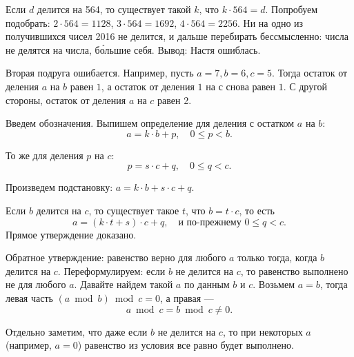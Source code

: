 ﻿
\begin{itemize}
\itA Если $d$ делится на 564, то существует такой $k$, что $k \cdot 564 = d$. Попробуем подобрать:
$2 \cdot 564 = 1128$, $3 \cdot 564 = 1692$, $4 \cdot 564 = 2256$. Ни на одно из получившихся чисел
2016 не делится, и дальше перебирать бессмысленно: числа не делятся на числа, б\'ольшие себя.
Вывод: Настя ошиблась.

\itB Вторая подруга ошибается. Например, пусть $a = 7, b = 6, c = 5$. Тогда остаток от деления
$a$ на $b$ равен $1$, а остаток от деления $1$ на $с$ снова равен $1$. С другой стороны, остаток
от деления $a$ на $c$ равен 2.

\itC Введем обозначения.
Выпишем определение для деления с остатком $a$ на $b$:
	$$a = k \cdot b + p,\quad 0 \le p < b.$$

То же для деления $p$ на $c$:
	$$p = s \cdot c + q,\quad 0 \le q < c.$$ 

Произведем подстановку: $a = k \cdot b + s \cdot c + q$. 

Если $b$ делится на $c$, то существует
такое $t$, что $b = t\cdot c$, то есть
	$$a = (k \cdot t + s) \cdot c + q,\quad \text{и по-прежнему }0 \le q < c.$$
Прямое утверждение доказано.

Обратное утверждение: равенство верно для любого $a$ только тогда, когда $b$ делится на $c$. 
Переформулируем: если $b$ не делится на $c$, то равенство выполнено не для любого $a$.
Давайте найдем такой $a$ по данным $b$ и $c$.
Возьмем $a = b$, тогда левая часть $(a \bmod b) \bmod c = 0$,
а правая ---
	$$a \bmod c = b \bmod c \ne 0.$$

Отдельно заметим, что даже если $b$ не делится на $c$, то при некоторых $a$ (например, $a = 0$)
равенство из условия все равно будет выполнено.

\end{itemize}
